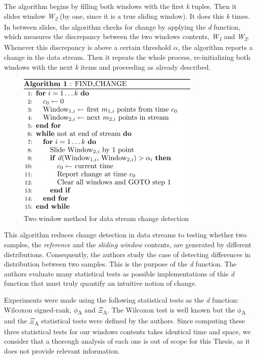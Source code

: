 The algorithm begins by filling both windows with the first \textit{k} tuples. Then it slides window \textit{W\textsubscript{2}} (by one, since it is a true sliding window). It does this \textit{k} times. In between slides, the algorithm checks for change by applying the \textit{d} function, which measures the discrepancy between the two windows contents, \textit{W\textsubscript{1}} and \textit{W\textsubscript{2}}. Whenever this discrepancy is above a certain threshold $\alpha$, the algorithm reports a change in the data stream. Then it repeats the whole process, re-initializing both windows with the next \textit{k} items and proceeding as already described. 

\begin{figure}[!htb]
    \begin{center}
      \includegraphics[scale=0.8]{figures/2-windows-change-pseudocode.png}
      \caption{Two window method for data stream change detection}
      \label{fig:change-detection-2-windows}
    \end{center}
\end{figure}

This algorithm reduces change detection in data streams to testing whether two samples, the \textit{reference} and the \textit{sliding window} contents, are generated by different distributions. Consequently, the authors study the case of detecting differences in distribution between two samples. This is the purpose of the \textit{d} function. The authors evaluate many statistical tests as possible implementations of this \textit{d} function that must truly quantify an intuitive notion of change. 

Experiments were made using the following statistical tests as the \textit{d} function: Wilcoxon signed-rank, $\phi$\textsubscript{A} and $\Xi$\textsubscript{A}. The Wilcoxon test is well known but the $\phi$\textsubscript{A} and the $\Xi$\textsubscript{A} statistical tests were defined by the authors. Since computing these three statistical tests for our windows contents takes identical time and space, we consider that a thorough analysis of each one is out of scope for this Thesis, as it does not provide relevant information. 

